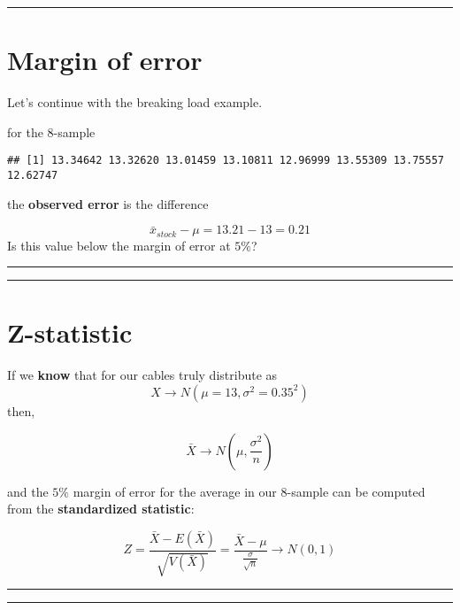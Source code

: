 \documentclass[
]{book}
\begin{document}
\begin{center}\rule{0.5\linewidth}{0.5pt}\end{center}

\hypertarget{margin-of-error-1}{%
\section{Margin of error}\label{margin-of-error-1}}

Let's continue with the breaking load example.

for the \(8\)-sample

\begin{verbatim}
## [1] 13.34642 13.32620 13.01459 13.10811 12.96999 13.55309 13.75557 12.62747
\end{verbatim}

the \textbf{observed error} is the difference

\[\bar{x}_{stock}-\mu=13.21-13=0.21\]
Is this value below the margin of error at \(5\%\)?

\begin{center}\rule{0.5\linewidth}{0.5pt}\end{center}

\begin{center}\rule{0.5\linewidth}{0.5pt}\end{center}

\hypertarget{z-statistic}{%
\section{Z-statistic}\label{z-statistic}}

If we \textbf{know} that for our cables truly distribute as
\[X \rightarrow N(\mu=13, \sigma^2=0.35^2)\] then,

\[\bar{X} \rightarrow N(\mu, \frac{\sigma^2}{n})\]

and the \(5\%\) margin of error for the average in our \(8\)-sample can be computed from the \textbf{standardized statistic}:

\[Z=\frac{\bar{X}-E(\bar{X})}{\sqrt{V(\bar{X})}} =\frac{\bar{X}-\mu}{\frac{\sigma}{\sqrt{n}}}  \rightarrow N(0,1)\]

\begin{center}\rule{0.5\linewidth}{0.5pt}\end{center}

\begin{center}\rule{0.5\linewidth}{0.5pt}\end{center}
\end{document}
